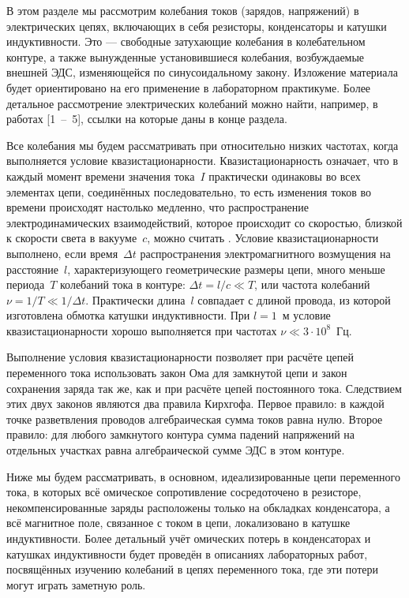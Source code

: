 
В этом разделе мы рассмотрим колебания токов (зарядов, напряжений) в
электрических цепях, включающих в себя резисторы, конденсаторы и катушки
индуктивности. Это --- свободные затухающие колебания в колебательном контуре, а
также вынужденные установившиеся колебания, возбуждаемые внешней ЭДС,
изменяющейся по синусоидальному закону. Изложение материала будет ориентировано
на его применение в лабораторном практикуме. Более детальное рассмотрение
электрических колебаний можно найти, например, в работах [1~--~5], ссылки на
которые даны в конце раздела.

Все колебания мы будем рассматривать при относительно низких частотах, когда
выполняется условие квазистационарности. Квазистационарность означает, что в
каждый момент времени значения тока~$I$ практически одинаковы во всех элементах
цепи, соединённых последовательно, то есть изменения токов во времени происходят
настолько медленно, что распространение электродинамических взаимодействий,
которое происходит со скоростью, близкой к скорости света в вакууме~$c$, можно
считать . Условие квазистационарности выполнено, если
время~$\Delta t$ распространения электромагнитного возмущения на расстояние~$l$,
характеризующего геометрические размеры цепи, много меньше периода~$T$ колебаний
тока в контуре: $\Delta t=l/c\ll T$, или частота колебаний $\nu=1/T\ll1/\Delta
t$. Практически длина~$l$ совпадает с длиной провода, из которой изготовлена
обмотка катушки индуктивности. При $l=1$~м условие квазистационарности хорошо
выполняется при частотах $\nu\ll3\cdot10^8$~Гц.

Выполнение условия квазистационарности позволяет при расчёте цепей переменного
тока использовать закон Ома для замкнутой цепи и закон сохранения заряда так же,
как и при расчёте цепей постоянного тока. Следствием этих двух законов являются
два правила Кирхгофа. Первое правило: в каждой точке разветвления проводов
алгебраическая сумма токов равна нулю. Второе правило: для любого замкнутого
контура сумма падений напряжений на отдельных участках равна алгебраической
сумме ЭДС в этом контуре.

Ниже мы будем рассматривать, в основном, идеализированные цепи переменного тока,
в которых всё омическое сопротивление сосредоточено в резисторе,
некомпенсированные заряды расположены только на обкладках конденсатора, а всё
магнитное поле, связанное с током в цепи, локализовано в катушке индуктивности.
Более детальный учёт омических потерь в конденсаторах и катушках индуктивности
будет проведён в описаниях лабораторных работ, посвящённых изучению колебаний в
цепях переменного тока, где эти потери могут играть заметную роль.

